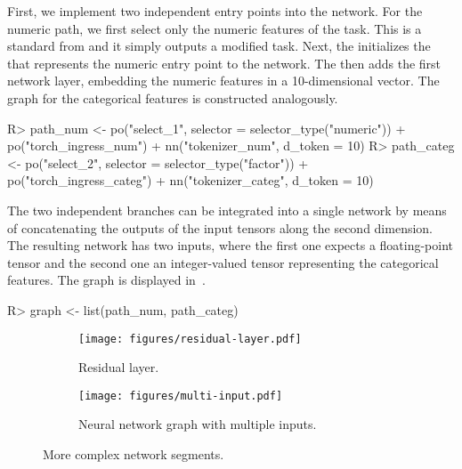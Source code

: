 \documentclass[article]{jss}
\theoremstyle{definition}
\begin{document}
First, we implement two independent entry points into the network.
For the numeric path, we first select only the numeric features of the task.
This is a standard  from  and it simply outputs a modified task.
Next, the  initializes the  that represents the numeric entry point to the network.
The  \citep{gorishniy2021revisiting} then adds the first network layer, embedding the numeric features in a 10-dimensional vector.
The graph for the categorical features is constructed analogously.

\begin{CodeInput}
R> path_num <- po("select_1", selector = selector_type("numeric")) %
+    po("torch_ingress_num") %
+    nn("tokenizer_num", d_token = 10)
R> path_categ <- po("select_2", selector = selector_type("factor")) %
+    po("torch_ingress_categ") %
+    nn("tokenizer_categ", d_token = 10)
\end{CodeInput}

The two independent branches can be integrated into a single network by means of concatenating the outputs of the input tensors along the second dimension.
The resulting network has two inputs, where the first one expects a floating-point tensor and the second one an integer-valued tensor representing the categorical features.
The graph is displayed in~.

\begin{CodeInput}
R> graph <- list(path_num, path_categ) %
\end{CodeInput}

\begin{figure}[h]
    \centering
    \begin{subfigure}{0.38\textwidth}
        \centering
        \texttt{[image: figures/residual-layer.pdf]}
        \caption{Residual layer.}
        \label{fig:residual-layer}
    \end{subfigure}
    \hfill
    \begin{subfigure}{0.58\textwidth}
        \centering
        \texttt{[image: figures/multi-input.pdf]}
        \caption{Neural network graph with multiple inputs.}
        \label{fig:multi-inputs}
    \end{subfigure}
    \caption{More complex network segments.}
    \label{fig:side-by-side}
\end{figure}
\end{document}
